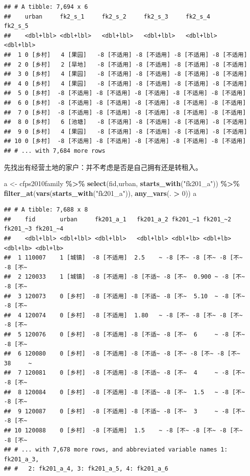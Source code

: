 \documentclass[
  oneside]{book}
\newenvironment{Shaded}{\begin{snugshade}}{\end{snugshade}}
\newcommand{\DecValTok}[1]{\textcolor[rgb]{0.00,0.00,0.81}{#1}}
\newcommand{\FunctionTok}[1]{\textcolor[rgb]{0.13,0.29,0.53}{\textbf{#1}}}
\newcommand{\NormalTok}[1]{#1}
\newcommand{\OtherTok}[1]{\textcolor[rgb]{0.56,0.35,0.01}{#1}}
\newcommand{\SpecialCharTok}[1]{\textcolor[rgb]{0.81,0.36,0.00}{\textbf{#1}}}
\newcommand{\StringTok}[1]{\textcolor[rgb]{0.31,0.60,0.02}{#1}}
\begin{document}
\begin{verbatim}
## # A tibble: 7,694 x 6
##    urban     fk2_s_1     fk2_s_2     fk2_s_3     fk2_s_4     fk2_s_5    
##    <dbl+lbl> <dbl+lbl>   <dbl+lbl>   <dbl+lbl>   <dbl+lbl>   <dbl+lbl>  
##  1 0 [乡村]   4 [果园]   -8 [不适用] -8 [不适用] -8 [不适用] -8 [不适用]
##  2 0 [乡村]   2 [旱地]   -8 [不适用] -8 [不适用] -8 [不适用] -8 [不适用]
##  3 0 [乡村]   4 [果园]   -8 [不适用] -8 [不适用] -8 [不适用] -8 [不适用]
##  4 0 [乡村]   4 [果园]   -8 [不适用] -8 [不适用] -8 [不适用] -8 [不适用]
##  5 0 [乡村]  -8 [不适用] -8 [不适用] -8 [不适用] -8 [不适用] -8 [不适用]
##  6 0 [乡村]  -8 [不适用] -8 [不适用] -8 [不适用] -8 [不适用] -8 [不适用]
##  7 0 [乡村]  -8 [不适用] -8 [不适用] -8 [不适用] -8 [不适用] -8 [不适用]
##  8 0 [乡村]   6 [池塘]   -8 [不适用] -8 [不适用] -8 [不适用] -8 [不适用]
##  9 0 [乡村]   4 [果园]   -8 [不适用] -8 [不适用] -8 [不适用] -8 [不适用]
## 10 0 [乡村]  -8 [不适用] -8 [不适用] -8 [不适用] -8 [不适用] -8 [不适用]
## # ... with 7,684 more rows
\end{verbatim}

先找出有经营土地的家户：并不考虑是否是自己拥有还是转租入。

\begin{Shaded}
\begin{Highlighting}[]
\NormalTok{a }\OtherTok{\textless{}{-}}\NormalTok{ cfps2010family }\SpecialCharTok{\%\textgreater{}\%}
  \FunctionTok{select}\NormalTok{(fid,urban, }\FunctionTok{starts\_with}\NormalTok{(}\StringTok{"fk201\_a"}\NormalTok{)) }\SpecialCharTok{\%\textgreater{}\%}
  \FunctionTok{filter\_at}\NormalTok{(}\FunctionTok{vars}\NormalTok{(}\FunctionTok{starts\_with}\NormalTok{(}\StringTok{"fk201\_a"}\NormalTok{)), }\FunctionTok{any\_vars}\NormalTok{(. }\SpecialCharTok{\textgreater{}} \DecValTok{0}\NormalTok{))}
\NormalTok{a}
\end{Highlighting}
\end{Shaded}

\begin{verbatim}
## # A tibble: 7,688 x 8
##    fid       urban     fk201_a_1   fk201_a_2 fk201_~1 fk201_~2 fk201_~3 fk201_~4
##    <dbl+lbl> <dbl+lbl> <dbl+lbl>   <dbl+lbl> <dbl+lb> <dbl+lb> <dbl+lb> <dbl+lb>
##  1 110007    1 [城镇]  -8 [不适用]  2.5    ~ -8 [不~ -8 [不~ -8 [不~ -8 [不~
##  2 120033    1 [城镇]  -8 [不适用] -8 [不适~ -8 [不~  0.900 ~ -8 [不~ -8 [不~
##  3 120073    0 [乡村]  -8 [不适用] -8 [不适~ -8 [不~  5.10  ~ -8 [不~ -8 [不~
##  4 120074    0 [乡村]  -8 [不适用]  1.80   ~ -8 [不~ -8 [不~ -8 [不~ -8 [不~
##  5 120076    0 [乡村]  -8 [不适用] -8 [不适~ -8 [不~  6     ~ -8 [不~ -8 [不~
##  6 120080    0 [乡村]  -8 [不适用] -8 [不适~ -8 [不~ -8 [不~ -8 [不~ 38     ~
##  7 120081    0 [乡村]  -8 [不适用] -8 [不适~ -8 [不~  4     ~ -8 [不~ -8 [不~
##  8 120084    0 [乡村]  -8 [不适用] -8 [不适~ -8 [不~  1.5   ~ -8 [不~ -8 [不~
##  9 120087    0 [乡村]  -8 [不适用] -8 [不适~ -8 [不~  3     ~ -8 [不~ -8 [不~
## 10 120088    0 [乡村]  -8 [不适用]  1.5    ~ -8 [不~ -8 [不~ -8 [不~ -8 [不~
## # ... with 7,678 more rows, and abbreviated variable names 1: fk201_a_3,
## #   2: fk201_a_4, 3: fk201_a_5, 4: fk201_a_6
\end{verbatim}
\end{document}
